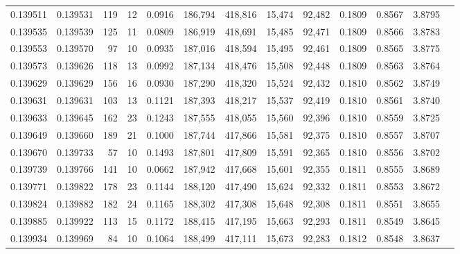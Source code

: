 \begin{tabular}{rrrrrrrrrrrrr}
0.139511 & 0.139531 &   119 &  12 &                                     0.0916 & 186,794 & 418,816 &  15,474 &  92,482 & 0.1809 & 0.8567 & 3.8795 \\
0.139535 & 0.139539 &   125 &  11 &                                     0.0809 & 186,919 & 418,691 &  15,485 &  92,471 & 0.1809 & 0.8566 & 3.8783 \\
0.139553 & 0.139570 &    97 &  10 &                                     0.0935 & 187,016 & 418,594 &  15,495 &  92,461 & 0.1809 & 0.8565 & 3.8775 \\
0.139573 & 0.139626 &   118 &  13 &                                     0.0992 & 187,134 & 418,476 &  15,508 &  92,448 & 0.1809 & 0.8563 & 3.8764 \\
0.139629 & 0.139629 &   156 &  16 &                                     0.0930 & 187,290 & 418,320 &  15,524 &  92,432 & 0.1810 & 0.8562 & 3.8749 \\
0.139631 & 0.139631 &   103 &  13 &                                     0.1121 & 187,393 & 418,217 &  15,537 &  92,419 & 0.1810 & 0.8561 & 3.8740 \\
0.139633 & 0.139645 &   162 &  23 &                                     0.1243 & 187,555 & 418,055 &  15,560 &  92,396 & 0.1810 & 0.8559 & 3.8725 \\
0.139649 & 0.139660 &   189 &  21 &                                     0.1000 & 187,744 & 417,866 &  15,581 &  92,375 & 0.1810 & 0.8557 & 3.8707 \\
0.139670 & 0.139733 &    57 &  10 &                                     0.1493 & 187,801 & 417,809 &  15,591 &  92,365 & 0.1810 & 0.8556 & 3.8702 \\
0.139739 & 0.139766 &   141 &  10 &                                     0.0662 & 187,942 & 417,668 &  15,601 &  92,355 & 0.1811 & 0.8555 & 3.8689 \\
0.139771 & 0.139822 &   178 &  23 &                                     0.1144 & 188,120 & 417,490 &  15,624 &  92,332 & 0.1811 & 0.8553 & 3.8672 \\
0.139824 & 0.139882 &   182 &  24 &                                     0.1165 & 188,302 & 417,308 &  15,648 &  92,308 & 0.1811 & 0.8551 & 3.8655 \\
0.139885 & 0.139922 &   113 &  15 &                                     0.1172 & 188,415 & 417,195 &  15,663 &  92,293 & 0.1811 & 0.8549 & 3.8645 \\
0.139934 & 0.139969 &    84 &  10 &                                     0.1064 & 188,499 & 417,111 &  15,673 &  92,283 & 0.1812 & 0.8548 & 3.8637 \\

\end{tabular}
